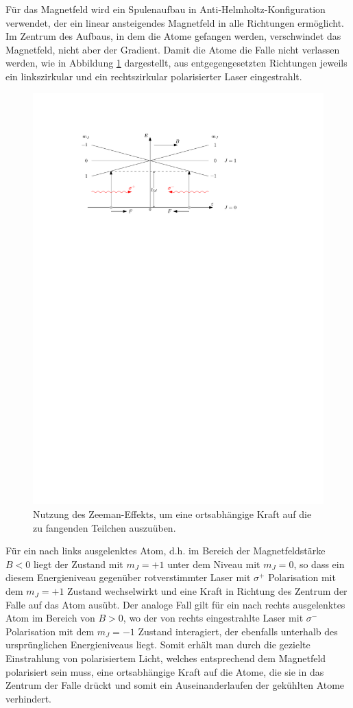 \documentclass[11pt, a4paper]{article}
\numberwithin{equation}{section}
\begin{document}
Für das Magnetfeld wird ein Spulenaufbau in Anti-Helmholtz-Konfiguration verwendet, der ein linear ansteigendes Magnetfeld in alle Richtungen ermöglicht.
Im Zentrum des Aufbaus, in dem die Atome gefangen werden, verschwindet das Magnetfeld, nicht aber der Gradient.
Damit die Atome die Falle nicht verlassen werden, wie in Abbildung \ref{fig:magnetfeld} dargestellt, aus entgegengesetzten Richtungen jeweils ein linkszirkular und ein rechtszirkular polarisierter Laser eingestrahlt.
\begin{figure}[h]
	\centering
	\includegraphics[width=.8\textwidth]{./figures/theory/mot.pdf}
	\caption{Nutzung des Zeeman-Effekts, um eine ortsabhängige Kraft auf die zu fangenden Teilchen auszuüben.}
	\label{fig:magnetfeld}
\end{figure}
Für ein nach links ausgelenktes Atom, d.h. im Bereich der Magnetfeldstärke $B<0$ liegt der Zustand mit $m_J=+1$ unter dem Niveau mit $m_J=0$, so dass ein diesem Energieniveau gegenüber rotverstimmter Laser mit $\sigma^+$ Polarisation mit dem $m_J=+1$ Zustand wechselwirkt und eine Kraft in Richtung des Zentrum der Falle auf das Atom ausübt.
Der analoge Fall gilt für ein nach rechts ausgelenktes Atom im Bereich von $B>0$, wo der von rechts eingestrahlte Laser mit $\sigma^-$ Polarisation mit dem $m_J=-1$ Zustand interagiert, der ebenfalls unterhalb des ursprünglichen Energieniveaus liegt.
Somit erhält man durch die gezielte Einstrahlung von polarisiertem Licht, welches entsprechend dem Magnetfeld polarisiert sein muss, eine ortsabhängige Kraft auf die Atome, die sie in das Zentrum der Falle drückt und somit ein Auseinanderlaufen der gekühlten Atome verhindert.
\end{document}

